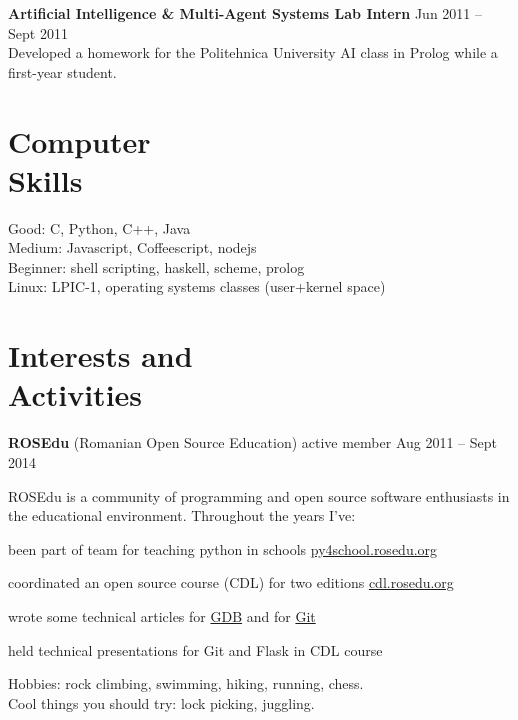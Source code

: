 \documentclass[margin,line]{resume}
\begin{document}
\begin{resume}
    \vspace{1.2mm}\textbf{Artificial Intelligence \& Multi-Agent Systems Lab Intern}
        \hfill Jun 2011 -- Sept 2011\vspace{1mm}\\
    {\fontsize{2.65mm}{1em}\selectfont
      Developed a homework for the Politehnica University AI class in Prolog while a first-year student.
    }
    \section{\mysidestyle Computer\\Skills}

    Good: C, Python, C++, Java                            \\
    Medium: Javascript, Coffeescript, nodejs  \\
    Beginner: shell scripting, haskell, scheme, prolog                    \\
    Linux: LPIC-1, operating systems classes (user+kernel space)


    \section{\mysidestyle Interests and \\Activities}

    \vspace{1.2mm}\textbf{ROSEdu} (Romanian Open Source Education)
        \hfill active member Aug 2011 -- Sept 2014\vspace{1mm}\\
    {\fontsize{2.65mm}{1em}\selectfont
      ROSEdu is a community of programming and open source software enthusiasts in the educational environment. Throughout the years I've:
      \begin{list2}
        \item been part of team for teaching python in schools \href{http://py4school.rosedu.org/}{py4school.rosedu.org}
        \item coordinated an open source course (CDL) for two editions \href{https://www.trade.it/}{cdl.rosedu.org}
        \item wrote some technical articles for \href{http://techblog.rosedu.org/gdb-a-basic-workflow.html}{GDB} and for \href{http://techblog.rosedu.org/git-speeding-workflow.html}{Git}
        \item held technical presentations for Git and Flask in CDL course
      \end{list2}
    }\vspace{-1mm}

    Hobbies: rock climbing, swimming, hiking, running, chess.\vspace{1.2mm}\\
    Cool things you should try: lock picking, juggling.



\end{resume}
\end{document}
